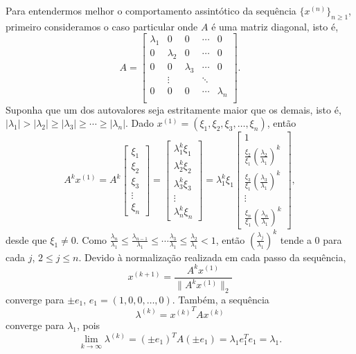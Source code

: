 Para entendermos melhor o comportamento assintótico da sequência $\{x^{(n)}\}_{n\geq 1}$, primeiro consideramos o caso particular onde $A$ é uma matriz diagonal, isto é,
\begin{equation*}
  A=\begin{bmatrix}
    \lambda_1&0&0&\cdots&0\\
    0&\lambda_2&0&\cdots&0\\
    0&  0&\lambda_3&\cdots&0\\
    &\vdots& &\ddots&\\
    0&  0&0&\cdots&\lambda_n\\
  \end{bmatrix}.
\end{equation*}
Suponha que um dos autovalores seja estritamente maior que os demais, isto é, $|\lambda_1|>|\lambda_2|\geq |\lambda_3|\geq \cdots\geq |\lambda_n|$. Dado $x^{(1)}=(\xi_1, \xi_2, \xi_3, \dotsc, \xi_n)$, então
\begin{equation*}
  A^kx^{(1)} = A^k\begin{bmatrix}\xi_1\\ \xi_2\\ \xi_3\\ \vdots \\ \xi_n\end{bmatrix} = \begin{bmatrix}\lambda_1^k\xi_1\\ \lambda_2^k\xi_2\\ \lambda_3^k\xi_3\\ \vdots \\ \lambda_n^k\xi_n\end{bmatrix} = \lambda_1^k\xi_1\begin{bmatrix}1\\ \frac{\xi_2}{\xi_1}\left(\frac{\lambda_2}{\lambda_1}\right)^k\\ \frac{\xi_3}{\xi_1}\left(\frac{\lambda_3}{\lambda_1}\right)^k\\ \vdots \\ \frac{\xi_n}{\xi_1}\left(\frac{\lambda_n}{\lambda_1}\right)^k\end{bmatrix},
\end{equation*}
desde que $\xi_1\neq 0$. Como $\frac{\lambda_n}{\lambda_1}\leq \frac{\lambda_{n-1}}{\lambda_1}\leq \cdots \frac{\lambda_3}{\lambda_1}\leq \frac{\lambda_2}{\lambda_1}<1$, então $\left(\frac{\lambda_j}{\lambda_1}\right)^k$ tende a $0$ para cada $j$, $2\leq j\leq n$. Devido à normalização realizada em cada passo da sequência,
\begin{equation*}
  x^{(k+1)}=\frac{A^kx^{(1)}}{\|A^kx^{(1)}\|_2}
\end{equation*}
converge para $\pm e_1$, $e_1=(1, 0, 0, \dotsc, 0)$. Também, a sequência
\begin{equation*}
  \lambda^{(k)}={x^{(k)}}^TAx^{(k)}
\end{equation*}
converge para $\lambda_1$, pois
\begin{equation*}
  \lim_{k\to\infty}\lambda^{(k)}=(\pm e_1)^TA(\pm e_1)=\lambda_1e_1^Te_1=\lambda_1.
\end{equation*}


